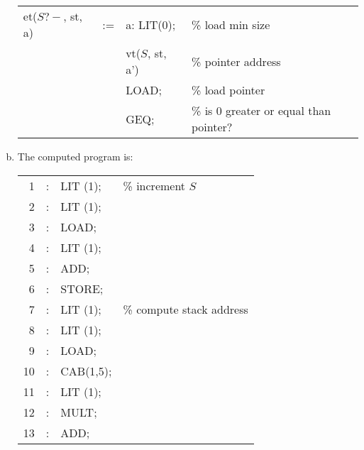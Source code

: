 \begin{solution}
\begin{enumerate}[(a)]
    \begin{tabular}{lcll}
        et($S?-$, st, a) & := & a: LIT(0);      & \% load min size \\
                         &    & vt($S$, st, a') & \% pointer address \\
                         &    & LOAD;           & \% load pointer \\
                         &    & GEQ;            & \% is 0 greater or equal than pointer? \\
    \end{tabular}




    \item The computed program is:\\

      \begin{tabular}{rcll}
         1 & : \hspace{0.3cm} & LIT (1); &\% increment $S$\\
         2 & : \hspace{0.3cm} & LIT (1); &\\
         3 & : \hspace{0.3cm} & LOAD; &\\
         4 & : \hspace{0.3cm} & LIT (1); &\\
         5 & : \hspace{0.3cm} & ADD; &\\
         6 & : \hspace{0.3cm} & STORE; &\\
         
         7 & : \hspace{0.3cm} & LIT (1); &\% compute stack address\\
         8 & : \hspace{0.3cm} & LIT (1); &\\
         9 & : \hspace{0.3cm} & LOAD; &\\
         10 & : \hspace{0.3cm} & CAB(1,5); &\\
         11 & : \hspace{0.3cm} & LIT (1); &\\
         12 & : \hspace{0.3cm} & MULT; &\\
         13 & : \hspace{0.3cm} & ADD; &\\
         

\end{tabular}
\end{enumerate}
\end{solution}
